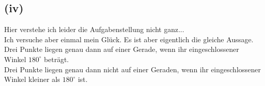 \documentclass[12pt,a4paper]{article}
\begin{document}
\subsection*{(iv)}
Hier verstehe ich leider die Aufgabenstellung nicht ganz...\\
Ich versuche aber einmal mein Glück. Es ist aber eigentlich die gleiche Aussage. \\

\noindent Drei Punkte liegen genau dann auf einer Gerade, wenn ihr eingeschlossener Winkel $180^\circ$ beträgt. \\

\noindent Drei Punkte liegen genau dann nicht auf einer Geraden, wenn ihr eingeschlossener Winkel kleiner als $180^\circ$ ist.
\end{document}
